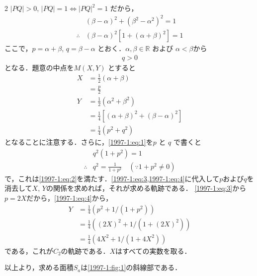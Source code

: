 \documentclass[../../main.tex]{subfiles}
\begin{document}
\begin{multicols}{2}
  $|PQ| > 0$, $|PQ|=1 \Longleftrightarrow |PQ|^2=1$ だから，
  \begin{align}
               & (\beta-\alpha)^2+(\beta^2-\alpha^2)^2 = 1 \nonumber                       \\
    \therefore & (\beta-\alpha)^2\left[1 + (\alpha+\beta)^2\right] = 1 \label{1997-1:eq:1}
  \end{align}
  ここで，$p=\alpha+\beta$, $q=\beta-\alpha$ とおく．$\alpha,\beta \in\mathbb{R}$ および $\alpha < \beta$から
  \begin{align}
    q >0    \label{1997-1:eq:2}
  \end{align}
  となる．題意の中点を$M(X,Y)$ とすると
  \begin{align}
    X
     & = \frac{1}{2}(\alpha+\beta)                                 \\
     & =\frac{p}{2} \label{1997-1:eq:3}                            \\
    Y
     & = \frac{1}{2}\left(\alpha^2+\beta^2\right)                  \\
     & = \frac{1}{4}\left[(\alpha+\beta)^2+(\beta-\alpha)^2\right] \\
     & = \frac{1}{4}\left(p^2+q^2\right)\label{1997-1:eq:4}
  \end{align}
  となることに注意する．さらに，\cref{1997-1:eq:1}を$p$ と $q$ で書くと
  \begin{align*}
     & q^2(1+p^2)  = 1                                    \\
    \therefore
     & q^2 = \frac{1}{1+p^2} \quad (\because 1+p^2\neq 0)
  \end{align*}
  で，これは\cref{1997-1:eq:2}を満たす．\cref{1997-1:eq:3,1997-1:eq:4}に代入して$p$および$q$を消去して$X$, $Y$の関係を求めれば，それが求める軌跡である．
  \cref{1997-1:eq:3}から$p=2X$だから，\cref{1997-1:eq:4}から，
  \begin{align*}
    Y
     & = \frac{1}{4}\left(p^2+1/(1+p^2)\right)       \\
     & = \frac{1}{4}\left((2X)^2+1/(1+(2X)^2)\right) \\
     & = \frac{1}{4}\left(4X^2+1/(1+4X^2)\right)
  \end{align*}
  である，これが$C_2$の軌跡である．$X$はすべての実数を取る．

  以上より，求める面積$S_{a}$は\cref{1997-1:fig:1}の斜線部である．

  \begin{figure}[H]
\end{figure}
\end{multicols}
\end{document}
